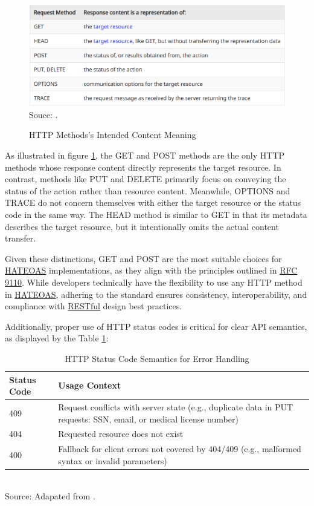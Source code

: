 \begin{figure}[H]
    \centering
    \caption{HTTP Methods's Intended Content Meaning}
    \includegraphics[width=1\linewidth]{figures/http/http_200_response_analyses.png}
    \label{fig:http-methods-intenteded-content}
    \footnotesize Souce: \cite{rfc9110}.
\end{figure}

As illustrated in figure \ref{fig:http-methods-intenteded-content}, the GET and POST methods are the only HTTP methods whose response content directly represents the target resource. In contrast, methods like PUT and DELETE primarily focus on conveying the status of the action rather than resource content. Meanwhile, OPTIONS and TRACE do not concern themselves with either the target resource or the status code in the same way. The HEAD method is similar to GET in that its metadata describes the target resource, but it intentionally omits the actual content transfer.

Given these distinctions, GET and POST are the most suitable choices for \hyperref[appendix:glossary]{HATEOAS} implementations, as they align with the principles outlined in \hyperref[appendix:glossary]{RFC} \href{https://www.rfc-editor.org/rfc/rfc9110.html}{9110}. While developers technically have the flexibility to use any HTTP method in \hyperref[appendix:glossary]{HATEOAS}, adhering to the standard ensures consistency, interoperability, and compliance with \hyperref[appendix:glossary]{RESTful} design best practices.

Additionally, proper use of HTTP status codes is critical for clear API semantics, as displayed by the Table \ref{http_error_codes}:

\begin{table}[H]
\centering
\caption{HTTP Status Code Semantics for Error Handling}
\label{http_error_codes}
\begin{tabular}{p{}p{}}
\toprule
\textbf{Status Code} & \textbf{Usage Context} \\
\midrule
409 & Request conflicts with server state (e.g., duplicate data in PUT requests: SSN, email, or medical license number) \\ \hline
404 & Requested resource does not exist \\ \hline
400 & Fallback for client errors not covered by 404/409 (e.g., malformed syntax or invalid parameters) \\
\bottomrule
\end{tabular}
\\ \footnotesize Source: Adapated from \cite{rfc9110}.
\end{table}

